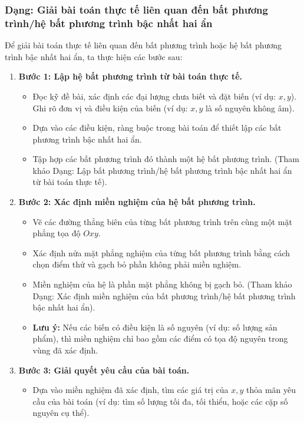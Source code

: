 \subsubsection{Dạng: Giải bài toán thực tế liên quan đến bất phương trình/hệ bất phương trình bậc nhất hai ẩn}
\begin{phuongphap}
Để giải bài toán thực tế liên quan đến bất phương trình hoặc hệ bất phương trình bậc nhất hai ẩn, ta thực hiện các bước sau:
\begin{enumerate}
    \item \textbf{Bước 1: Lập hệ bất phương trình từ bài toán thực tế.}
    \begin{itemize}
        \item Đọc kỹ đề bài, xác định các đại lượng chưa biết và đặt biến (ví dụ: $x, y$). Ghi rõ đơn vị và điều kiện của biến (ví dụ: $x, y$ là số nguyên không âm).
        \item Dựa vào các điều kiện, ràng buộc trong bài toán để thiết lập các bất phương trình bậc nhất hai ẩn.
        \item Tập hợp các bất phương trình đó thành một hệ bất phương trình. (Tham khảo Dạng: Lập bất phương trình/hệ bất phương trình bậc nhất hai ẩn từ bài toán thực tế).
    \end{itemize}
    \item \textbf{Bước 2: Xác định miền nghiệm của hệ bất phương trình.}
    \begin{itemize}
        \item Vẽ các đường thẳng biên của từng bất phương trình trên cùng một mặt phẳng tọa độ $Oxy$.
        \item Xác định nửa mặt phẳng nghiệm của từng bất phương trình bằng cách chọn điểm thử và gạch bỏ phần không phải miền nghiệm.
        \item Miền nghiệm của hệ là phần mặt phẳng không bị gạch bỏ. (Tham khảo Dạng: Xác định miền nghiệm của bất phương trình/hệ bất phương trình bậc nhất hai ẩn).
        \item \textbf{Lưu ý:} Nếu các biến có điều kiện là số nguyên (ví dụ: số lượng sản phẩm), thì miền nghiệm chỉ bao gồm các điểm có tọa độ nguyên trong vùng đã xác định.
    \end{itemize}
    \item \textbf{Bước 3: Giải quyết yêu cầu của bài toán.}
    \begin{itemize}
        \item Dựa vào miền nghiệm đã xác định, tìm các giá trị của $x, y$ thỏa mãn yêu cầu của bài toán (ví dụ: tìm số lượng tối đa, tối thiểu, hoặc các cặp số nguyên cụ thể).

\end{itemize}
\end{enumerate}
\end{phuongphap}

